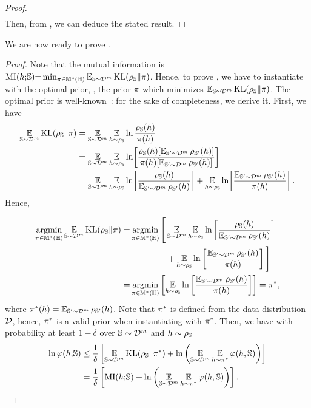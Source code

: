 \begin{noaddcontents}
\begin{proof}
\begin{align}
\end{align}
Then, from , we can deduce the stated result.
\end{proof}
We are now ready to prove .
\theoremmutualinfokl*
\begin{proof}
Note that the mutual information is $\MI(\h{;} \S){=} \min_{\P\in\M^{*}(\H)}\EE_{\S\sim\D^\m}\KL(\AQ\|\P)$. 
Hence, to prove , we have to instantiate  with the optimal prior, \ie, the prior $\P$ which minimizes $\EE_{\S\sim\D^\m}\KL(\AQ\|\P)$.
The optimal prior is well-known~\citep[see, \eg,][]{Catoni2007,LeverLavioletteShaweTaylor2013}: for the sake of completeness, we derive it. First, we have
\begin{align*}
    \EE_{\S\sim\D^\m}\KL(\AQ\|\P) &= \EE_{\S\sim\D^\m}\EE_{\h\sim\AQ}\ln\frac{\AQ(\h)}{\P(\h)}\\
    &= \EE_{\S\sim\D^\m}\EE_{\h\sim\AQ}\ln\!\LB\frac{\AQ(\h)[\EE_{\S'\sim\D^\m}\Q_{\S'}(\h)]}{\P(\h)[\EE_{\S'\sim\D^\m}\Q_{\S'}(\h)]}\RB\\
    &= \EE_{\S\sim\D^\m}\EE_{\h\sim\AQ}\ln\!\LB\frac{\AQ(\h)}{\EE_{\S'\sim\D^\m}\Q_{\S'}(\h)}\RB{+}\EE_{\h\sim\AQ}\ln\!\LB\frac{\EE_{\S'\sim\D^\m}\Q_{\S'}(\h)}{\P(\h)}\RB.
\end{align*}
Hence, 

\begin{align*}
    \argmin_{\P\in\M^{*}(\H)}\EE_{\S\sim\D^\m}\KL(\AQ\|\P)= &\argmin_{\P\in\M^{*}(\H)} \Bigg[\EE_{\S\sim\D^\m}\EE_{\h\sim\AQ}\ln\LB\frac{\AQ(\h)}{\EE_{\S'\sim\D^\m}\Q_{\S'}(\h)}\RB\\
    &\hspace{1.5cm}+ \EE_{\h\sim\AQ}\ln\LB\frac{\EE_{\S'\sim\D^\m}\Q_{\S'}(\h)}{\P(\h)}\RB\Bigg]\\
    =&\argmin_{\P\in\M^{*}(\H)}\LB \EE_{\h\sim\AQ}\ln\LB\frac{\EE_{\S'\sim\D^\m}\Q_{\S'}(\h)}{\P(\h)}\RB \RB=\P^*,
\end{align*}
where $\P^*(\h) = \EE_{\S'\sim\D^\m}\Q_{\S'}(\h)$.
Note that $\P^*$ is defined from the data distribution $\D$, hence, $\P^*$ is a valid prior when instantiating  with $\P^*$.
Then, we have with probability at least $1{-}\delta$ over $\S\sim\D^\m$ and $\h\sim\AQ$
\begin{align*}
    \ln\varphi(\h,\!\S) &\le \frac{1}{\delta}\LB\EE_{\S\sim\D^\m}\KL(\AQ\|\P^*) +\ln\LP\EE_{\S\sim\D^\m}\EE_{\h\sim\P^*}\varphi(\h, \S)\RP\RB\\
    &= \frac{1}{\delta}\LB \MI(\h{;} \S) +\ln\LP\EE_{\S\sim\D^\m}\EE_{\h\sim\P^*}\varphi(\h, \S)\RP\RB.
\end{align*}
\end{proof}


\end{noaddcontents}
